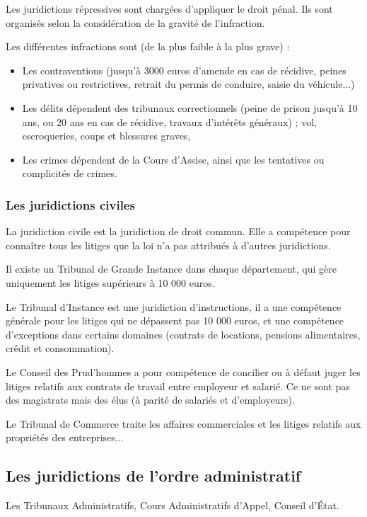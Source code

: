 \documentclass[10pt,a4paper]{article}
\begin{document}
Les juridictions répressives sont chargées d'appliquer le droit pénal. Ils sont organisés selon la considération de la gravité de l'infraction.

Les différentes infractions sont (de la plus faible à la plus grave) :
\begin{itemize}
\item Les contraventions (jusqu'à 3000 euros d'amende en cas de récidive, peines privatives ou restrictives, retrait du permis de conduire, saisie du véhicule...)
\item Les délits dépendent des tribunaux correctionnels (peine de prison jusqu'à 10 ans, ou 20 ans en cas de récidive, travaux d'intérêts généraux) ; vol, escroqueries, coups et blessures graves,
\item Les crimes dépendent de la Cours d'Assise, ainsi que les tentatives ou complicités de crimes.
\end{itemize}

\subsubsection{Les juridictions civiles}

La juridiction civile est la juridiction de droit commun. Elle a compétence pour connaître tous les litiges que la loi n'a pas attribués à d'autres juridictions.

Il existe un Tribunal de Grande Instance dans chaque département, qui gère uniquement les litiges supérieurs à 10 000 euros.

Le Tribunal d'Instance est une juridiction d'instructions, il a une compétence générale pour les litiges qui ne dépassent pas 10 000 euros, et une compétence d'exceptions dans certains domaines (contrats de locations, pensions alimentaires, crédit et consommation).

Le Conseil des Prud'hommes a pour compétence de concilier ou à défaut juger les litiges relatifs aux contrats de travail entre employeur et salarié. Ce ne sont pas des magistrats mais des élus (à parité de salariés et d'employeurs).

Le Tribunal de Commerce traite les affaires commerciales et les litiges relatifs aux propriétés des entreprises...

\subsection{Les juridictions de l'ordre administratif}

Les Tribunaux Administratifs, Cours Administratifs d'Appel, Conseil d'État.
\end{document}
